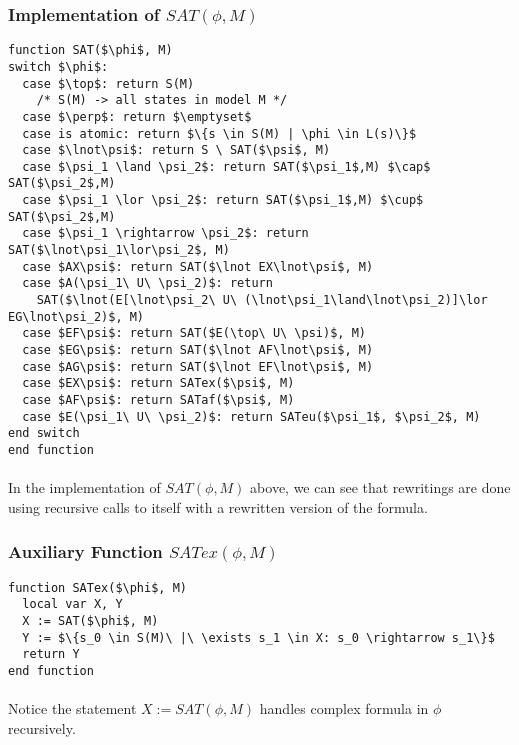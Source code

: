 \documentclass{article}
\theoremstyle{plain}
\theoremstyle{definition}
\begin{document}
\begin{multicols}{2}
\subsubsection{Implementation of $SAT(\phi, M)$}

\begin{lstlisting}[mathescape=true]
function SAT($\phi$, M)
switch $\phi$:
  case $\top$: return S(M) 
    /* S(M) -> all states in model M */
  case $\perp$: return $\emptyset$
  case is atomic: return $\{s \in S(M) | \phi \in L(s)\}$
  case $\lnot\psi$: return S \ SAT($\psi$, M)
  case $\psi_1 \land \psi_2$: return SAT($\psi_1$,M) $\cap$ SAT($\psi_2$,M)
  case $\psi_1 \lor \psi_2$: return SAT($\psi_1$,M) $\cup$ SAT($\psi_2$,M)
  case $\psi_1 \rightarrow \psi_2$: return SAT($\lnot\psi_1\lor\psi_2$, M)
  case $AX\psi$: return SAT($\lnot EX\lnot\psi$, M)
  case $A(\psi_1\ U\ \psi_2)$: return
    SAT($\lnot(E[\lnot\psi_2\ U\ (\lnot\psi_1\land\lnot\psi_2)]\lor EG\lnot\psi_2)$, M)
  case $EF\psi$: return SAT($E(\top\ U\ \psi)$, M)
  case $EG\psi$: return SAT($\lnot AF\lnot\psi$, M)
  case $AG\psi$: return SAT($\lnot EF\lnot\psi$, M)
  case $EX\psi$: return SATex($\psi$, M)
  case $AF\psi$: return SATaf($\psi$, M)
  case $E(\psi_1\ U\ \psi_2)$: return SATeu($\psi_1$, $\psi_2$, M)
end switch
end function
\end{lstlisting}

\paragraph{} In the implementation of $SAT(\phi, M)$ above, we can see that rewritings are done using recursive calls to itself with a rewritten version of the formula.

\subsubsection{Auxiliary Function $SATex(\phi, M)$}

\begin{lstlisting}[mathescape=true]
function SATex($\phi$, M)
  local var X, Y
  X := SAT($\phi$, M)
  Y := $\{s_0 \in S(M)\ |\ \exists s_1 \in X: s_0 \rightarrow s_1\}$
  return Y
end function
\end{lstlisting}

\paragraph{} Notice the statement $X := SAT(\phi, M)$ handles complex formula in $\phi$ recursively. 


\end{multicols}
\end{document}
